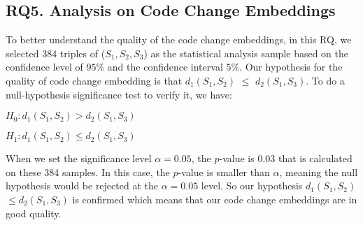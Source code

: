 \subsection{RQ5. Analysis on Code Change Embeddings}

To better understand the quality of the code change embeddings, in this RQ, we selected 384 triples of ($S_1, S_2, S_3$) as the statistical analysis sample based on the confidence level of $95\%$ and the confidence interval $5\%$. Our hypothesis for the quality of code change embedding is that $d_1(S_1,S_2)$ $\leq$ $d_2(S_1,S_3)$. To do a null-hypothesis significance test to verify it, we have:

\textit{\textbf{$H_0: d_1(S_1,S_2) > d_2(S_1,S_3)$}} 

\textit{\textbf{$H_1: d_1(S_1,S_2) \leq d_2(S_1,S_3)$}}

When we set the significance level $\alpha = 0.05$, the $p$-value is $0.03$ that is calculated on these 384 samples. In this case, the $p$-value is smaller than $\alpha$, meaning the null hypothesis would be rejected at the $\alpha = 0.05$ level. So our hypothesis $d_1(S_1,S_2)$$ \leq$$ d_2(S_1,S_3)$ is confirmed which means that our code change embeddings are in good quality.



